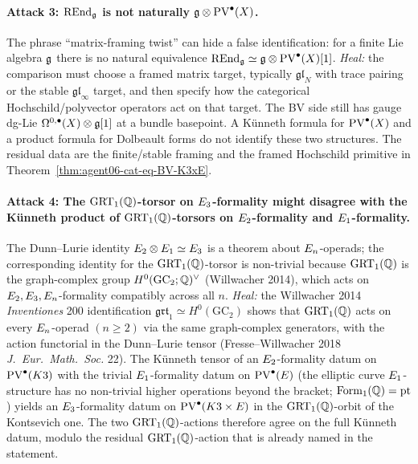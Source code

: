 \paragraph{Attack 3: $\mathrm{REnd}_\mathfrak g$ is not naturally
$\mathfrak g\otimes\mathrm{PV}^\bullet(X)$.}
The phrase ``matrix-framing twist'' can hide a false identification:
for a finite Lie algebra $\mathfrak g$ there is no natural equivalence
$\mathrm{REnd}_\mathfrak g \simeq \mathfrak g\otimes\mathrm{PV}^\bullet(X)[1]$.
\emph{Heal:} the comparison must choose a framed matrix target,
typically $\mathfrak{gl}_N$ with trace pairing or the stable
$\mathfrak{gl}_\infty$ target, and then specify how the categorical
Hochschild/polyvector operators act on that target. The BV side still
has gauge dg-Lie $\Omega^{0,\bullet}(X)\otimes\mathfrak g[1]$ at a bundle
basepoint. A K\"unneth formula for $\mathrm{PV}^\bullet(X)$ and a product
formula for Dolbeault forms do not identify these two structures. The
residual data are the finite/stable framing and the framed
Hochschild primitive in Theorem~\ref{thm:agent06-cat-eq-BV-K3xE}.

\paragraph{Attack 4: The $\mathrm{GRT}_1(\mathbb Q)$-torsor on $E_3$-formality
might disagree with the K\"unneth product of $\mathrm{GRT}_1(\mathbb Q)$-torsors on
$E_2$-formality and $E_1$-formality.}
The Dunn--Lurie identity $E_2 \otimes E_1 \simeq E_3$ is a
theorem about $E_n$-operads; the corresponding identity for the
$\mathrm{GRT}_1(\mathbb Q)$-torsor is non-trivial because $\mathrm{GRT}_1(\mathbb Q)$ is the
graph-complex group $H^0(\mathrm{GC}_2; \mathbb Q)^\vee$ (Willwacher 2014),
which acts on $E_2, E_3, E_n$-formality compatibly across all
$n$. \emph{Heal:} the Willwacher 2014 \emph{Inventiones} 200
identification $\mathfrak{grt}_1 \simeq H^0(\mathrm{GC}_2)$ shows that
$\mathrm{GRT}_1(\mathbb Q)$ acts on every $E_n$-operad $(n \geq 2)$ via the same
graph-complex generators, with the action functorial in the
Dunn--Lurie tensor (Fresse--Willwacher 2018 \emph{J.\ Eur.\ Math.\
Soc.} 22). The K\"unneth tensor of an $E_2$-formality datum on
$\mathrm{PV}^\bullet(K3)$ with the trivial $E_1$-formality datum on
$\mathrm{PV}^\bullet(E)$ (the elliptic curve $E_1$-structure has no
non-trivial higher operations beyond the bracket;
$\mathrm{Form}_1(\mathbb Q) = \mathrm{pt}$) yields an $E_3$-formality
datum on $\mathrm{PV}^\bullet(K3 \times E)$ in the $\mathrm{GRT}_1(\mathbb Q)$-orbit of the
Kontsevich one. The two $\mathrm{GRT}_1(\mathbb Q)$-actions therefore agree on the
full K\"unneth datum, modulo the residual $\mathrm{GRT}_1(\mathbb Q)$-action that is
already named in the statement.

